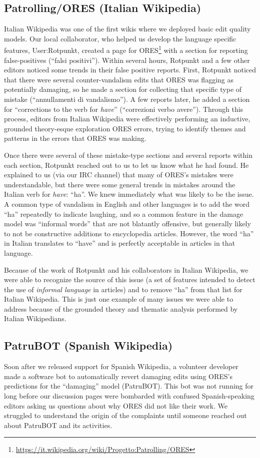 \subsection{Patrolling/ORES (Italian Wikipedia)}
Italian Wikipedia was one of the first wikis where we deployed basic edit quality models.  Our local collaborator, who helped us develop the language specific features, User:Rotpunkt, created a page for ORES\footnote{\url{https://it.wikipedia.org/wiki/Progetto:Patrolling/ORES}} with a section for reporting false-positives (``falsi positivi'').  Within several hours, Rotpunkt and a few other editors noticed some trends in their false positive reports.  First, Rotpunkt noticed that there were several counter-vandalism edits that ORES was flagging as potentially damaging, so he made a section for collecting that specific type of mistake (``annullamenti di vandalismo'').  A few reports later, he added a section for ``corrections to the verb for \emph{have}'' (``correzioni verbo avere'').  Through this process, editors from Italian Wikipedia were effectively performing an inductive, grounded theory-esque exploration ORES errors, trying to identify themes and patterns in the errors that ORES was making.

Once there were several of these mistake-type sections and several reports within each section, Rotpunkt reached out to us to let us know what he had found.  He explained to us (via our IRC channel) that many of ORES's mistakes were understandable, but there were some general trends in mistakes around the Italian verb for \emph{have}: ``ha''.  We knew immediately what was likely to be the issue. A common type of vandalism in English and other languages is to add the word ``ha'' repeatedly to indicate laughing, and so a common feature in the damage model was ``informal words'' that are not blatantly offensive, but generally likely to not be constructive additions to encyclopedia articles.  However, the word ``ha'' in Italian translates to ``have'' and is perfectly acceptable in articles in that language.

Because of the work of Rotpunkt and his collaborators in Italian Wikipedia, we were able to recognize the source of this issue (a set of features intended to detect the use of \emph{informal language} in articles) and to remove ``ha'' from that list for Italian Wikipedia.  This is just one example of many issues we were able to address because of the grounded theory and thematic analysis performed by Italian Wikipedians.

\subsection{PatruBOT (Spanish Wikipedia)}
Soon after we released support for Spanish Wikipedia, a volunteer developer made a software bot to automatically revert damaging edits using ORES's predictions for the ``damaging'' model (PatruBOT).  This bot was not running for long before our discussion pages were bombarded with confused Spanish-speaking editors asking us questions about why ORES did not like their work.  We struggled to understand the origin of the complaints until someone reached out about PatruBOT and its activities.

